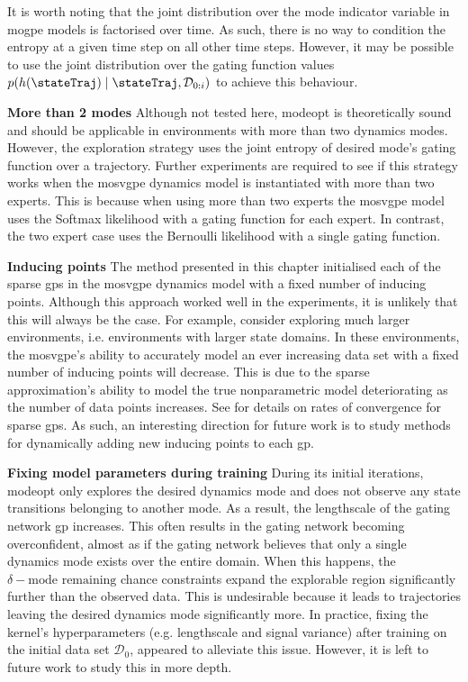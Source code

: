 \documentclass{mimosis-class/mimosis}
\numberwithin{equation}{chapter}
\newcommand{\dataset}{\ensuremath{\mathcal{D}}}
\newcommand{\gatingFunc}{\ensuremath{h}}
\begin{document}
{It is worth noting that the joint distribution over the mode indicator variable
in \acrshort{mogpe} models is factorised over time.
As such, there is no way to condition the entropy at a given time step on all other time steps.
However, it may be possible to use the joint distribution over the gating function
values \(p(\gatingFunc(\stateTraj) \mid \stateTraj, \dataset_{0:i})\)  to achieve this behaviour.

\newline

\textbf{More than 2 modes}
Although not tested here, \acrshort{modeopt} is theoretically sound and should be applicable in environments with more than
two dynamics modes.
However, the exploration strategy uses the joint entropy of desired mode's gating function over a trajectory.
Further experiments are required to see if this strategy works when the \acrshort{mosvgpe} dynamics model is
instantiated with more than two experts.
This is because when using more than two experts the \acrshort{mosvgpe} model uses the Softmax likelihood
with a gating function for each expert.
In contrast, the two expert case uses the Bernoulli likelihood with a single gating function.

\textbf{Inducing points}
The method presented in this chapter initialised each of the sparse
\acrshort{gps} in the \acrshort{mosvgpe} dynamics model with a fixed number of inducing points. Although this
approach worked well in the experiments, it is unlikely that this will
always be the case. For example, consider exploring much larger environments, i.e.
environments with larger state domains. In these environments, the
\acrshort{mosvgpe}'s
ability to accurately model an ever increasing data set with a fixed number of inducing points will decrease.
This is due
to the sparse approximation’s ability to model the true nonparametric model deteriorating as
the number of data points increases. See \cite{burtRates2019} for details
on rates of convergence for sparse \acrshort{gps}. As such, an interesting direction for future
work is to study methods for dynamically adding new inducing points to each \acrshort{gp}.

\textbf{Fixing model parameters during training}
During its initial iterations,
\acrshort{modeopt} only explores the desired dynamics mode and does not observe any state
transitions belonging to another mode. As a result, the lengthscale of the gating network \acrshort{gp} increases.
This often results in the gating network becoming overconfident,
almost as if the gating network believes that only a single dynamics mode exists over
the entire domain. When this happens, the \(\delta-\text{mode remaining}\) chance constraints
expand the explorable region significantly further than the observed data. This is
undesirable because it leads to trajectories leaving the desired dynamics mode significantly more.
In practice, fixing the kernel’s hyperparameters (e.g. lengthscale
and signal variance) after training on the initial data set \(\dataset_0\), appeared to alleviate this
issue. However, it is left to future work to study this in more depth.


}
\end{document}
